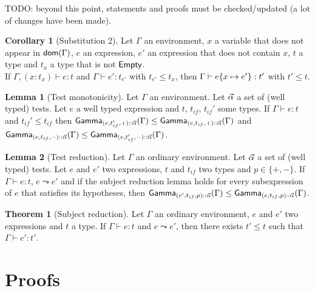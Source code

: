 \documentclass[a4paper]{article}
\theoremstyle{definition}
\newtheorem{theorem}{Theorem}
\newtheorem{lemma}{Lemma}
\newtheorem{corollary}{Corollary}
\begin{document}
        TODO: beyond this point, statements and proofs must be checked/updated (a lot of changes have been made).

        \begin{corollary}[Substitution 2]
          Let $\Gamma$ an environment, $x$ a variable that does not appear in $\textsf{dom}(\Gamma)$, $e$ an expression, $e'$ an expression that does not contain $x$, $t$ a type and $t_x$ a type that is not $\textsf{Empty}$.\\
          If $\Gamma, (x:t_x) \vdash e:t$ and $\Gamma \vdash e':t_{e'}$ with $t_{e'} \leq t_x$, then $\Gamma \vdash e \{x \mapsto e'\}:t'$ with $t'\leq t$.
        \end{corollary}
    
        \begin{lemma}[Test monotonicity]
          Let $\Gamma$ an environment. Let $\vec \alpha$ a set of (well typed) tests. Let $e$ a well typed expression and $t$, $t_{if}$, $t_{if}'$ some types.
          If $\Gamma \vdash e : t$ and $t_{if}' \leq t_{if}$ then $\textsf{Gamma}_{{(e,t_{if}',+)}\textsf{::}{\vec \alpha}}(\Gamma) \leq \textsf{Gamma}_{{(e,t_{if},+)}\textsf{::}{\vec \alpha}}(\Gamma)$
          and $\textsf{Gamma}_{{(e,t_{if},-)}\textsf{::}{\vec \alpha}}(\Gamma) \leq \textsf{Gamma}_{{(e,t_{if}',-)}\textsf{::}{\vec \alpha}}(\Gamma)$.
        \end{lemma}
    
        \begin{lemma}[Test reduction]
          Let $\Gamma$ an ordinary environment. Let $\vec \alpha$ a set of (well typed) tests. Let $e$ and $e'$ two expressions, $t$ and $t_{if}$ two types and $p \in \{+,-\}$.
          If $\Gamma \vdash e : t$, $e \leadsto e'$ and if the subject reduction lemma holds for every subexpression of $e$ that satisfies its hypotheses,
          then $\textsf{Gamma}_{{(e',t_{if},p)}\textsf{::}{\vec \alpha}}(\Gamma) \leq \textsf{Gamma}_{{(e,t_{if},p)}\textsf{::}{\vec \alpha}}(\Gamma)$.
        \end{lemma}
    
        \begin{theorem}[Subject reduction]
          Let $\Gamma$ an ordinary environment, $e$ and $e'$ two expressions and $t$ a type.
          If $\Gamma \vdash e : t$ and $e \leadsto e'$, then there exists $t' \leq t$ such that $\Gamma \vdash e' : t'$.
        \end{theorem}
    
        \section{Proofs}
    
\end{document}

